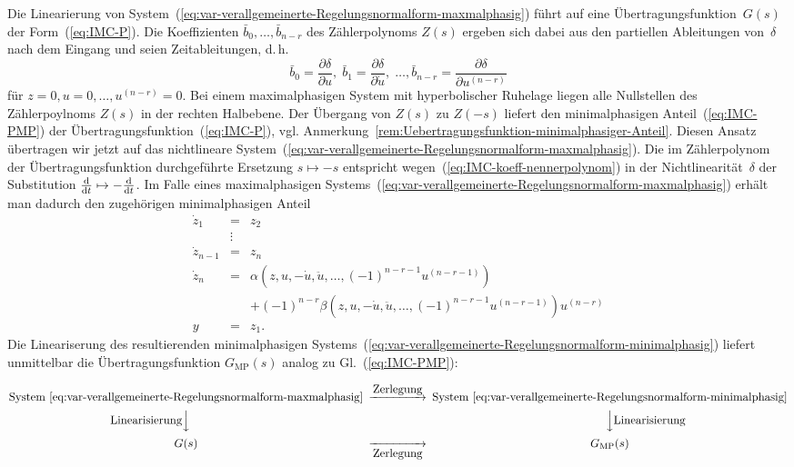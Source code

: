 Die Linearierung von System~(\ref{eq:var-verallgemeinerte-Regelungsnormalform-maxmalphasig})
führt auf eine Übertragungsfunktion~$G(s)$ der Form~(\ref{eq:IMC-P}).
Die Koeffizienten $\bar{b}_{0},\ldots,\bar{b}_{n-r}$ des Zählerpolynoms
$Z(s)$ ergeben sich dabei aus den partiellen Ableitungen von~$\delta$
nach dem Eingang und seien Zeitableitungen, d.\,h. 
\begin{equation}
\bar{b}_{0}=\frac{\partial\delta}{\partial u},\;\bar{b}_{1}=\frac{\partial\delta}{\partial\dot{u}},\;\ldots,\bar{b}_{n-r}=\frac{\partial\delta}{\partial u^{(n-r)}}\label{eq:IMC-koeff-nennerpolynom}
\end{equation}
für $z=0,u=0,\ldots,u^{(n-r)}=0$. Bei einem maximalphasigen System
mit hyperbolischer Ruhelage liegen alle Nullstellen des Zählerpoylnoms
$Z(s)$ in der rechten Halbebene. Der Übergang von $Z(s)$ zu $Z(-s)$
liefert den minimalphasigen Anteil~(\ref{eq:IMC-PMP}) der Übertragungsfunktion~(\ref{eq:IMC-P}),
vgl. Anmerkung~\ref{rem:Uebertragungsfunktion-minimalphasiger-Anteil}.
Diesen Ansatz übertragen wir jetzt auf das nichtlineare System~(\ref{eq:var-verallgemeinerte-Regelungsnormalform-maxmalphasig}).
Die im Zählerpolynom der Übertragungsfunktion durchgeführte Ersetzung
$s\mapsto-s$ entspricht wegen~(\ref{eq:IMC-koeff-nennerpolynom})
in der Nichtlinearität~$\delta$ der Substitution $\tfrac{{\mathrm{d}}}{{\mathrm{d}} t}\mapsto-\tfrac{{\mathrm{d}}}{{\mathrm{d}} t}$.
Im Falle eines maximalphasigen Systems~(\ref{eq:var-verallgemeinerte-Regelungsnormalform-maxmalphasig})
erhält man dadurch den zugehörigen minimalphasigen Anteil
\begin{equation}
\begin{array}{lcl}
\dot{z}_{1} & = & z_{2}\\
 & \vdots\\
\dot{z}_{n-1} & = & z_{n}\\
\dot{z}_{n} & = & \alpha\left(z,u,-\dot{u},\ddot{u},\ldots,(-1)^{n-r-1}u^{(n-r-1)}\right)\\
 &  & +(-1)^{n-r}\beta\left(z,u,-\dot{u},\ddot{u},\ldots,(-1)^{n-r-1}u^{(n-r-1)}\right)u^{(n-r)}\\
y & = & z_{1}.
\end{array}\label{eq:var-verallgemeinerte-Regelungsnormalform-minimalphasig}
\end{equation}
Die Lineariserung des resultierenden minimalphasigen Systems~(\ref{eq:var-verallgemeinerte-Regelungsnormalform-minimalphasig})
liefert unmittelbar die Übertragungsfunktion $G_{\text{MP}}(s)$ analog
zu Gl.~(\ref{eq:IMC-PMP}):

\[
\begin{CD}
\text{System}~\eqref{eq:var-verallgemeinerte-Regelungsnormalform-maxmalphasig} @>{\displaystyle\text{Zerlegung}}>>\text{System}~\eqref{eq:var-verallgemeinerte-Regelungsnormalform-minimalphasig}\\
@V{\displaystyle\text{Linearisierung}}VV @VV{\displaystyle\text{Linearisierung}}V\\
G(s) @>>{\displaystyle\text{Zerlegung}}> G_\text{MP}(s)
\end{CD}
\]

